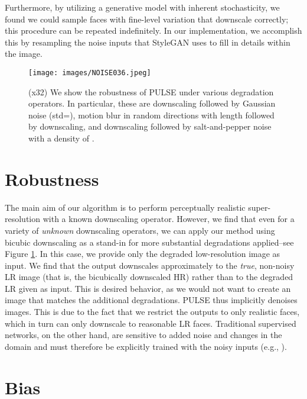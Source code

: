 \documentclass[10pt,twocolumn,letterpaper]{article}
\begin{document}
Furthermore, by utilizing a generative model with inherent stochasticity, we found we could sample faces with fine-level variation that downscale correctly; this procedure can be repeated indefinitely. In our implementation, we accomplish this by resampling the noise inputs that StyleGAN uses to fill in details within the image.




\begin{figure}[]
    \centering
    \texttt{[image: images/NOISE036.jpeg]}
    \caption{(x32) We show the robustness of PULSE under various degradation operators. In particular, these are downscaling followed by Gaussian noise (std=), motion blur in random directions with length  followed by downscaling, and downscaling followed by salt-and-pepper noise with a density of .}
    \label{fig:NOISE}
\end{figure}

\section{Robustness}
The main aim of our algorithm is to perform perceptually realistic super-resolution with a known downscaling operator. However, we find that even for a variety of \textit{unknown} downscaling operators, we can apply our method using bicubic downscaling as a stand-in for more substantial degradations applied--see Figure \ref{fig:NOISE}. In this case, we provide only the degraded low-resolution image as input. We find that the output downscales approximately to the \textit{true}, non-noisy LR image (that is, the bicubically downscaled HR) rather than to the degraded LR given as input. This is desired behavior, as we would not want to create an image that matches the additional degradations. PULSE thus implicitly denoises images. This is due to the fact that we restrict the outputs to only realistic faces, which in turn can only downscale to reasonable LR faces. Traditional supervised networks, on the other hand, are sensitive to added noise and changes in the domain and must therefore be explicitly trained with the noisy inputs (e.g., \cite{DNSR}). 

\section{Bias} \label{bias}
\end{document}
